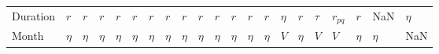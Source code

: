 \begin{tabular}{lllllllllllllllllllll}
Duration &       $r$ &       $r$ &       $r$ &       $r$ &       $r$ &       $r$ &       $r$ &       $r$ &       $r$ &       $r$ &       $r$ &       $r$ &       $r$ &  $\eta$ &       $r$ &  $\tau$ &  $r_{pq}$ &       $r$ &       NaN &  $\eta$ \\
Month    &    $\eta$ &    $\eta$ &    $\eta$ &    $\eta$ &    $\eta$ &    $\eta$ &    $\eta$ &    $\eta$ &    $\eta$ &    $\eta$ &    $\eta$ &    $\eta$ &    $\eta$ &     $V$ &    $\eta$ &     $V$ &       $V$ &    $\eta$ &    $\eta$ &     NaN \\
\bottomrule
\end{tabular}
